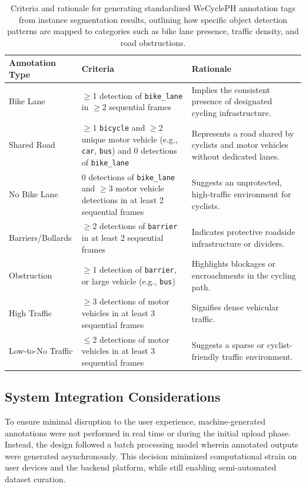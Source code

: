 \begin{table}[H]
\centering
\begin{tabular}{|p{3.5cm}|p{6cm}|p{5.5cm}|}
\hline
\textbf{Annotation Type} & \textbf{Criteria} & \textbf{Rationale} \\
\hline
Bike Lane & $\geq$1 detection of \texttt{bike\_lane} in $\geq$2 sequential frames & Implies the consistent presence of designated cycling infrastructure. \\
\hline
Shared Road & $\geq$1 \texttt{bicycle} and $\geq$2 unique motor vehicle (e.g., \texttt{car}, \texttt{bus}) and 0 detections of \texttt{bike\_lane} & Represents a road shared by cyclists and motor vehicles without dedicated lanes. \\
\hline
No Bike Lane & 0 detections of \texttt{bike\_lane} and $\geq$3 motor vehicle detections in at least 2 sequential frames & Suggests an unprotected, high-traffic environment for cyclists. \\
\hline
Barriers/Bollards & $\geq$2 detections of \texttt{barrier} in at least 2 sequential frames & Indicates protective roadside infrastructure or dividers. \\
\hline
Obstruction & $\geq$1 detection of \texttt{barrier}, or large vehicle (e.g., \texttt{bus}) & Highlights blockages or encroachments in the cycling path. \\
\hline
High Traffic & $\geq$3 detections of motor vehicles in at least 3 sequential frames & Signifies dense vehicular traffic. \\
\hline
Low-to-No Traffic & $\leq$2 detections of motor vehicles in at least 3 sequential frames & Suggests a sparse or cyclist-friendly traffic environment. \\
\hline
\end{tabular}
\caption{Criteria and rationale for generating standardized WeCyclePH annotation tags from instance segmentation results, outlining how specific object detection patterns are mapped to categories such as bike lane presence, traffic density, and road obstructions.}
\label{tab:annotation_logic}
\end{table}

\subsection{System Integration Considerations}

To ensure minimal disruption to the user experience, machine-generated annotations were not performed in real time or during the initial upload phase. Instead, the design followed a batch processing model wherein annotated outputs were generated asynchronously. This decision minimized computational strain on user devices and the backend platform, while still enabling semi-automated dataset curation.  

